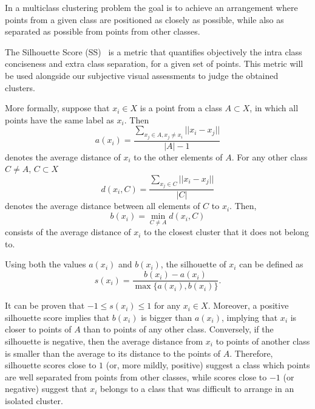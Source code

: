 \documentclass[sn-basic]{sn-jnl}%
\theoremstyle{thmstyleone}%
\theoremstyle{thmstyletwo}%
\theoremstyle{thmstylethree}%
\begin{document}
In a multiclass clustering problem the goal is to achieve an arrangement where points from a given class are positioned as closely as possible, while also as separated as possible from points from other classes.

The Silhouette Score (SS)~\citep{rousseeuw-silhouette} is a metric that quantifies objectively the intra class conciseness and extra class separation, for a given set of points. This metric will be used alongside our subjective visual assessments to judge the obtained clusters.

More formally, suppose that $x_i \in X$ is a point from a class $A \subset X$, in which all points have the same label as $x_i$. Then
\begin{equation}
a(x_i) = \frac{ \sum\limits_{x_j \in A, x_j \neq x_i} || x_i - x_j || }{|A| - 1}
\end{equation}
denotes the average distance of $x_i$ to the other elements of $A$. 
For any other class $C \neq A$, $C \subset X$
\begin{equation}
d(x_i, C) = \frac{\sum\limits_{x_j \in C} || x_i - x_j || }{|C|}
\end{equation}
denotes the average distance between all elements of $C$ to $x_i$. Then,
\begin{equation}
b(x_i) = \min\limits_{C \neq A} d(x_i, C)
\end{equation}
consists of the average distance of $x_i$ to the closest cluster that it does not belong to.

Using both the values $a(x_i)$ and $b(x_i)$, the silhouette of $x_i$ can be defined as
\begin{equation}
\label{eq:silhouette}
s(x_i) = \frac{b(x_i) - a(x_i)}{\max\{a(x_i), b(x_i)\}}.
\end{equation}

It can be proven that $-1 \leq s(x_i) \leq 1$ for any $x_i \in X$. Moreover, a positive silhouette score implies that $b(x_i)$ is bigger than $a(x_i)$, implying that $x_i$ is closer to points of $A$ than to points of any other class. Conversely, if the silhouette is negative, then the average distance from $x_i$ to points of another class is smaller than the average to its distance to the points of $A$. Therefore, silhouette scores close to $1$ (or, more mildly, positive) suggest a class which points are well separated from points from other classes, while scores close to $-1$ (or negative) suggest that $x_i$ belongs to a class that was difficult to arrange in an isolated cluster.
\end{document}
